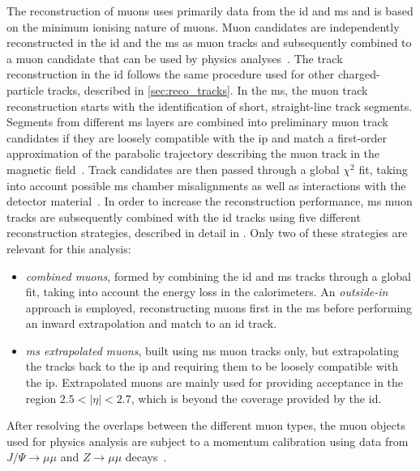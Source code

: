 The reconstruction of muons uses primarily data from the \gls{id} and \gls{ms} and is based on the minimum ionising nature of muons. Muon candidates are independently reconstructed in the \gls{id} and the \gls{ms} as muon tracks and subsequently combined to a muon candidate that can be used by physics analyses~\cite{PERF-2015-10,Aad:2020gmm}.
The track reconstruction in the \gls{id} follows the same procedure used for other charged-particle tracks, described in \cref{sec:reco_tracks}.
In the \gls{ms}, the muon track reconstruction starts with the identification of short, straight-line track segments. Segments from different \gls{ms} layers are combined into preliminary muon track candidates if they are loosely compatible with the \gls{ip} and match a first-order approximation of the parabolic trajectory describing the muon track in the magnetic field~\cite{Aad:2020gmm}.
Track candidates are then passed through a global $\chi^2$ fit, taking into account possible \gls{ms} chamber misalignments as well as interactions with the detector material~\cite{Aad:2020gmm}.
In order to increase the reconstruction performance, \gls{ms} muon tracks are subsequently combined with the \gls{id} tracks using five different reconstruction strategies, described in detail in \cite{Aad:2020gmm}.
Only two of these strategies are relevant for this analysis:
\begin{itemize}
	\item \textit{combined muons}, formed by combining the \gls{id} and \gls{ms} tracks through a global fit, taking into account the energy loss in the calorimeters. An \textit{outside-in} approach is employed, reconstructing muons first in the \gls{ms} before performing an inward extrapolation and match to an \gls{id} track.
	\item \textit{\gls{ms} extrapolated muons}, built using \gls{ms} muon tracks only, but extrapolating the tracks back to the \gls{ip} and requiring them to be loosely compatible with the \gls{ip}. Extrapolated muons are mainly used for providing acceptance in the region $2.5 < \vert\eta\vert < 2.7$, which is beyond the coverage provided by the \gls{id}.
\end{itemize}
After resolving the overlaps between the different muon types, the muon objects used for physics analysis are subject to a momentum calibration using data from $J/\Psi\rightarrow\mu\mu$ and $Z\rightarrow\mu\mu$ decays~\cite{Aad:2020gmm}.

